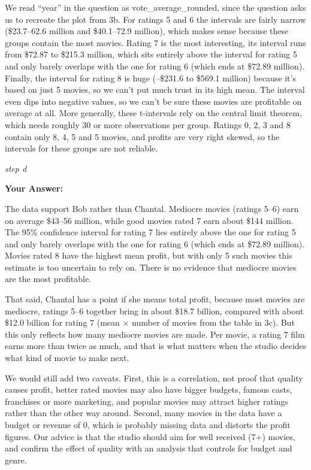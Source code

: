 \documentclass[
]{article}
\begin{document}
We read ``year'' in the question as vote\_average\_rounded, since the
question asks us to recreate the plot from 3b. For ratings 5 and 6 the
intervals are fairly narrow (\$23.7--62.6 million and \$40.1--72.9
million), which makes sense because these groups contain the most
movies. Rating 7 is the most interesting, its interval runs from \$72.87
to \$215.3 million, which sits entirely above the interval for rating 5
and only barely overlaps with the one for rating 6 (which ends at
\$72.89 million). Finally, the interval for rating 8 is huge (--\$231.6
to \$569.1 million) because it's based on just 5 movies, so we can't put
much trust in its high mean. The interval even dips into negative
values, so we can't be sure these movies are profitable on average at
all. More generally, these t-intervals rely on the central limit
theorem, which needs roughly 30 or more observations per group. Ratings
0, 2, 3 and 8 contain only 8, 4, 5 and 5 movies, and profits are very
right skewed, so the intervals for these groups are not reliable.

\emph{step d}

\textbf{Your Answer:}

The data support Bob rather than Chantal. Mediocre movies (ratings 5--6)
earn on average \$43--56 million, while good movies rated 7 earn about
\$144 million. The 95\% confidence interval for rating 7 lies entirely
above the one for rating 5 and only barely overlaps with the one for
rating 6 (which ends at \$72.89 million). Movies rated 8 have the
highest mean profit, but with only 5 such movies this estimate is too
uncertain to rely on. There is no evidence that mediocre movies are the
most profitable.

That said, Chantal has a point if she means total profit, because most
movies are mediocre, ratings 5--6 together bring in about \$18.7
billion, compared with about \$12.0 billion for rating 7 (mean × number
of movies from the table in 3c). But this only reflects how many
mediocre movies are made. Per movie, a rating 7 film earns more than
twice as much, and that is what matters when the studio decides what
kind of movie to make next.

We would still add two caveats. First, this is a correlation, not proof
that quality causes profit, better rated movies may also have bigger
budgets, famous casts, franchises or more marketing, and popular movies
may attract higher ratings rather than the other way around. Second,
many movies in the data have a budget or revenue of 0, which is probably
missing data and distorts the profit figures. Our advice is that the
studio should aim for well received (7+) movies, and confirm the effect
of quality with an analysis that controls for budget and genre.
\end{document}
